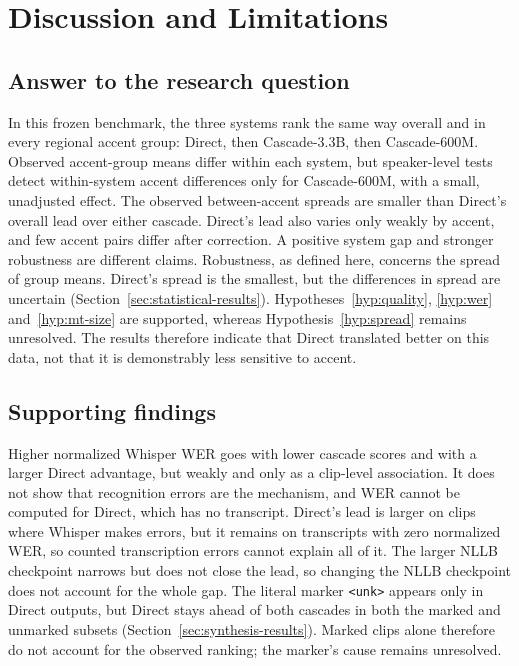 \section{Discussion and Limitations}
\label{sec:discussion}

\subsection{Answer to the research question}
In this frozen benchmark, the
three systems rank the same way overall and in every regional accent
group: Direct, then Cascade-3.3B, then Cascade-600M. Observed accent-group
means differ within each system, but speaker-level tests detect within-system
accent differences only for Cascade-600M, with a small, unadjusted effect.
The observed between-accent spreads are smaller than Direct's overall lead
over either cascade. Direct's lead also varies
only weakly by accent, and few accent pairs differ after correction. A
positive system gap and stronger robustness are different claims.
Robustness, as defined here, concerns the spread of group means. Direct's
spread is the smallest, but the differences in spread are uncertain
(Section~\ref{sec:statistical-results}). Hypotheses~\ref{hyp:quality},
\ref{hyp:wer} and~\ref{hyp:mt-size} are supported, whereas
Hypothesis~\ref{hyp:spread} remains unresolved. The results therefore indicate that Direct translated better on
this data, not that it is demonstrably less sensitive to accent.

\subsection{Supporting findings}
Higher normalized Whisper WER goes with
lower cascade scores and with a larger Direct advantage, but weakly and
only as a clip-level association. It does not show that recognition errors
are the mechanism, and WER cannot be computed for Direct, which has no
transcript. Direct's lead is larger on clips where Whisper makes errors,
but it remains on transcripts with zero normalized WER, so counted transcription
errors cannot explain all of it. The larger NLLB checkpoint narrows but does not close
the lead, so changing the NLLB checkpoint does not account for the whole
gap. The literal marker \texttt{<unk>} appears only in Direct
outputs, but Direct stays ahead of both cascades in both the marked and
unmarked subsets (Section~\ref{sec:synthesis-results}). Marked clips alone
therefore do not account for the observed ranking; the marker's cause
remains unresolved.

